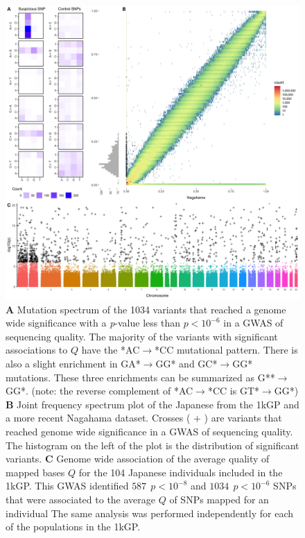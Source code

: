 \documentclass[custompaper]{MBE}%
\begin{document}
\begin{figure}
\includegraphics[width=\hsize,keepaspectratio]{./Figures/Figure1.jpg}
\caption{
\textbf{A} 
Mutation spectrum of the 1034 variants that reached a genome wide significance with a \textit{p}-value less than $p < 10^{-6}$  in a GWAS of sequencing quality. 
The majority of the variants with significant associations to $Q$ have the *AC${\rightarrow}$*CC mutational pattern. There is also a slight enrichment in GA*${\rightarrow}$GG* and GC*${\rightarrow}$GG* mutations. These three enrichments can be summarized as G**${\rightarrow}$GG*. (note: the reverse complement of *AC${\rightarrow}$*CC is GT*${\rightarrow}$GG*)
\textbf{B} 
Joint frequency spectrum plot of the Japanese from the 1kGP and a more recent Nagahama dataset.
Crosses ( + ) are variants that reached genome wide significance in a GWAS of sequencing quality. 
The histogram on the left of the plot is the distribution of significant variants. 
\textbf{C} 
Genome wide association of the average quality of mapped bases $Q$ for the 104 Japanese individuals included in the 1kGP. This GWAS identified $587\ \  p < 10^{-8}$ and $1034\ \ p < 10^{-6}$ SNPs that were associated to the average $Q$ of SNPs mapped for an individual
The same analysis was performed independently for each of the populations in the 1kGP. }
 \label{SFS}
\end{figure}
\end{document}
